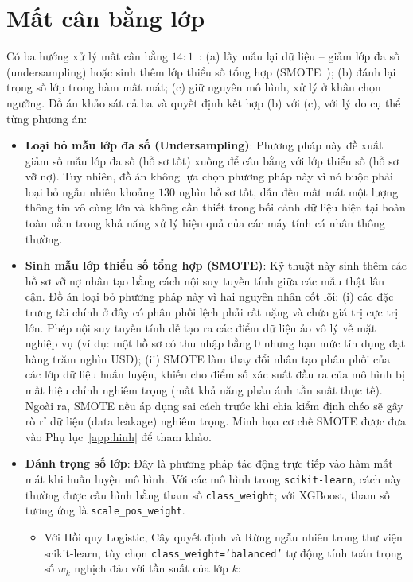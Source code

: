 \documentclass[12pt,a4paper,oneside]{report}
\theoremstyle{vnplain}
\theoremstyle{vndef}
\begin{document}
\section{Mất cân bằng lớp}\label{sec:imbalance}
Có ba hướng xử lý mất cân bằng $14{:}1$~\cite{he2009}: (a) lấy mẫu lại dữ liệu --
giảm lớp đa số (undersampling) hoặc sinh thêm lớp thiểu số tổng hợp
(SMOTE~\cite{chawla2002}); (b) đánh lại trọng số lớp trong hàm mất mát; (c) giữ nguyên mô
hình, xử lý ở khâu chọn ngưỡng. Đồ án khảo sát cả ba và quyết định kết hợp (b) với (c),
với lý do cụ thể từng phương án:
\begin{itemize}
  \item \textbf{Loại bỏ mẫu lớp đa số (Undersampling)}: Phương pháp này đề xuất giảm số mẫu lớp đa số (hồ sơ tốt) xuống để cân bằng với lớp thiểu số (hồ sơ vỡ nợ). Tuy nhiên, đồ án không lựa chọn phương pháp này vì nó buộc phải loại bỏ ngẫu nhiên khoảng $130$ nghìn hồ sơ tốt, dẫn đến mất mát một lượng thông tin vô cùng lớn và không cần thiết trong bối cảnh dữ liệu hiện tại hoàn toàn nằm trong khả năng xử lý hiệu quả của các máy tính cá nhân thông thường.
  \item \textbf{Sinh mẫu lớp thiểu số tổng hợp (SMOTE)}: Kỹ thuật này sinh thêm các hồ sơ vỡ nợ nhân tạo bằng cách nội suy tuyến tính giữa các mẫu thật lân cận. Đồ án loại bỏ phương pháp này vì hai nguyên nhân cốt lõi: (i) các đặc trưng tài chính ở đây có phân phối lệch phải rất nặng và chứa giá trị cực trị lớn. Phép nội suy tuyến tính dễ tạo ra các điểm dữ liệu ảo vô lý về mặt nghiệp vụ (ví dụ: một hồ sơ có thu nhập bằng $0$ nhưng hạn mức tín dụng đạt hàng trăm nghìn USD); (ii) SMOTE làm thay đổi nhân tạo phân phối của các lớp dữ liệu huấn luyện, khiến cho điểm số xác suất đầu ra của mô hình bị mất hiệu chỉnh nghiêm trọng (mất khả năng phản ánh tần suất thực tế). Ngoài ra, SMOTE nếu áp dụng sai cách trước khi chia kiểm định chéo sẽ gây rò rỉ dữ liệu (data leakage) nghiêm trọng. Minh họa cơ chế SMOTE được đưa vào Phụ lục~\ref{app:hinh} để tham khảo.
  \item \textbf{Đánh trọng số lớp}: Đây là phương pháp tác động trực tiếp vào hàm mất mát khi huấn luyện mô hình. Với các mô hình trong \texttt{scikit-learn}, cách này thường được cấu hình bằng tham số \texttt{class\_weight}; với XGBoost, tham số tương ứng là \texttt{scale\_pos\_weight}.
        \begin{itemize}
          \item Với Hồi quy Logistic, Cây quyết định và Rừng ngẫu nhiên trong thư viện scikit-learn, tùy chọn \texttt{class\_weight='balanced'} tự động tính toán trọng số $w_k$ nghịch đảo với tần suất của lớp $k$:

\end{itemize}
\end{itemize}
\end{document}
